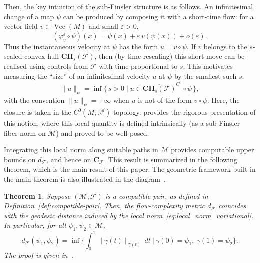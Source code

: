 \documentclass[12pt]{amsart}
\numberwithin{equation}{section}
\newtheorem{theorem}{Theorem}[section]
\theoremstyle{remark}
\newcommand{\cjp}[1]{{\color{orange} CJ: \footnotesize #1}}
\begin{document}
Then, the key intuition of the sub-Finsler structure is as follows.
An infinitesimal change of a map $\psi$ can be produced by composing it with a short-time flow:
for a vector field $v\in \operatorname{Vec}(M)$ and small $\varepsilon>0$,
\[
    (\varphi_v^{\varepsilon}\circ \psi)(x)=\psi(x)+\varepsilon\,v(\psi(x))+o(\varepsilon).
\]
Thus the instantaneous velocity at $\psi$ has the form $u=v\circ \psi$.
If $v$ belongs to the $s$-scaled convex hull $\mathbf{CH}_s(\mathcal F)$, then (by time-rescaling)
this short move can be realised using controls from $\mathcal F$ with time proportional to $s$.
This motivates measuring the ``size'' of an infinitesimal velocity $u$ at $\psi$ by the smallest such $s$:
\begin{equation}
    \label{eq:local_norm_variational}
    \|u\|_{\psi}=\inf\{\,s>0\mid u\in \overline{\mathbf{CH}_s(\mathcal F)}^{C^0}\circ \psi\,\},
\end{equation}
with the convention $\|u\|_{\psi}=+\infty$ when $u$ is not of the form $v\circ\psi$.
Here, the closure is taken in the $C^0(M, \mathbb R^d)$ topology.
 provides the rigorous presentation of this notion,
where this local quantity is defined intrinsically (as a sub-Finsler fiber norm on $\mathcal M$)
and proved to be well-posed.



Integrating this local
norm along suitable paths in $\mathcal M$ provides computable upper bounds on
$d_{\mathcal F}$, and hence on $\mathbf C_{\mathcal F}$. 
This result is summarized in the following theorem, which is the main result of this paper.
The geometric framework built in the main theorem is also illustrated in the diagram~.

\begin{theorem}
\label{thm:main}
Suppose $(\mathcal M, \mathcal F)$ is a compatible pair, as defined in Definition~\ref{def:compatible-pair}. Then, the flow-complexity metric $d_{\mathcal F}$
coincides with the geodesic distance induced by the local norm~\eqref{eq:local_norm_variational}.
In particular, for all $\psi_1,\psi_2\in\mathcal M$,
\begin{equation}
    \label{eq:geodesic_distance}
    d_{\mathcal F}(\psi_1,\psi_2)
    =\inf\Big\{\int_0^1 \|\dot\gamma(t)\|_{\gamma(t)}\,dt\ \Big|\ \gamma(0)=\psi_1,\ \gamma(1)=\psi_2\Big\}.
\end{equation}
The proof is given in~.
\end{theorem}
\end{document}
